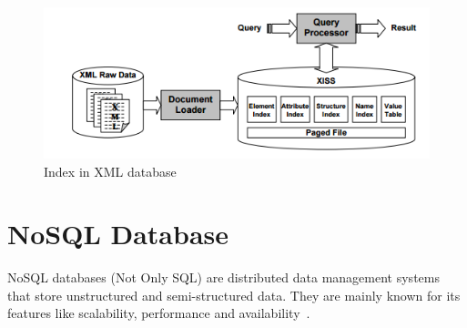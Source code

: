 \documentclass[a4paper,12pt]{book}
\begin{document}
\begin{figure}[h]
    \includegraphics[width=1\textwidth]{img/Indexing}
    \caption{Index in XML
    database~\cite{li2001indexing}}
    \label{fig:xml-indexes}
\end{figure}

	\section{NoSQL Database}
	NoSQL databases (Not Only SQL) are distributed data management systems that store unstructured and semi-structured data. They are mainly known for its features like scalability, performance and availability~\citep{hecht2011nosql}.
	
\end{document}
